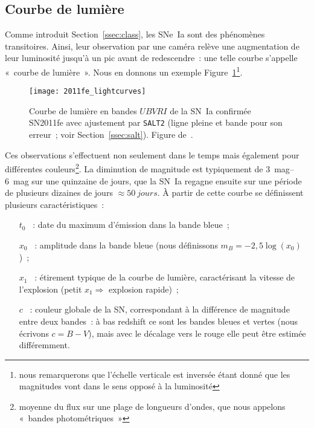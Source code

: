 \documentclass[../main/main.tex]{subfiles}
\begin{document}
\subsection{Courbe de lumière}\label{ssec:lc}

Comme introduit Section~\ref{ssec:class}, les SNe~Ia sont des phénomènes
transitoires. Ainsi, leur observation par une caméra relève une augmentation de
leur luminosité jusqu'à un pic avant de redescendre~: une telle courbe s'appelle
«~courbe de lumière~». Nous en donnons un exemple
Figure~\ref{fig:2011fe_phot}\footnote{nous remarquerons que l'échelle verticale
    est inversée étant donné que les magnitudes vont dans le sens opposé à la
luminosité}.

\begin{figure}[]
    \centering
    \texttt{[image: 2011fe\_lightcurves]}
    \caption[Courbe de lumière de la SN~Ia SN2011fe]{Courbe de lumière en bandes
        $UBVRI$ de la SN~Ia confirmée SN2011fe avec ajustement par
        \texttt{SALT2} (ligne pleine et bande pour son erreur~;
        voir Section~\ref{ssec:salt}). Figure
    de~\cite{pereira2013}.}\label{fig:2011fe_phot}
\end{figure}

Ces observations s'effectuent non seulement dans le temps mais également pour
différentes couleurs\footnote{moyenne du flux sur une plage de longueurs
d'ondes, que nous appelons «~bandes photométriques~»}. La diminution de magnitude
est typiquement de \SIrange{3}{6}{mag} sur une quinzaine de jours, que la SN~Ia
regagne ensuite sur une période de plusieurs dizaines de jours $\approx
\SI{50}{jours}$. À partir de cette courbe se définissent plusieurs
caractéristiques~:

\begin{itemize}
    \item[$t_0$]~: date du maximum d'émission dans la bande bleue~;
    \item[$x_0$]~: amplitude dans la bande bleue (nous définissons $m_B =
        -2,5\log(x_0)$)~;
    \item[$x_1$]~: étirement typique de la courbe de lumière, caractérisant la
        vitesse de l'explosion (petit $x_1 \Rightarrow$ explosion rapide)~;
    \item[$c$]~: couleur globale de la SN, correspondant à la différence de
        magnitude entre deux bandes~: à bas redshift ce sont les bandes bleues
        et vertes (nous écrivons $c = B - V$), mais avec le décalage vers le
        rouge elle peut être estimée différemment.
\end{itemize}
\end{document}
